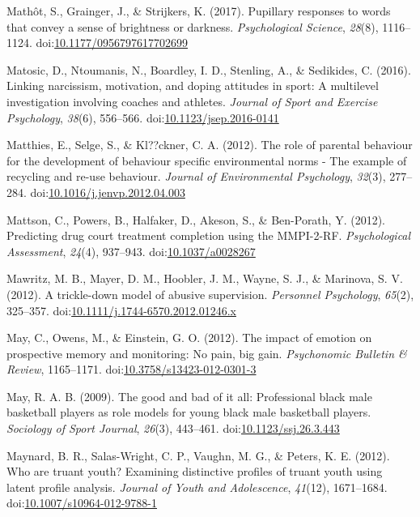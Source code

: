 \documentclass[english,man]{apa6}
\begin{document}
\hypertarget{ref-Mathot2017}{}
Mathôt, S., Grainger, J., \& Strijkers, K. (2017). Pupillary responses
to words that convey a sense of brightness or darkness.
\emph{Psychological Science}, \emph{28}(8), 1116--1124.
doi:\href{https://doi.org/10.1177/0956797617702699}{10.1177/0956797617702699}

\hypertarget{ref-Matosic2016}{}
Matosic, D., Ntoumanis, N., Boardley, I. D., Stenling, A., \& Sedikides,
C. (2016). Linking narcissism, motivation, and doping attitudes in
sport: A multilevel investigation involving coaches and athletes.
\emph{Journal of Sport and Exercise Psychology}, \emph{38}(6), 556--566.
doi:\href{https://doi.org/10.1123/jsep.2016-0141}{10.1123/jsep.2016-0141}

\hypertarget{ref-Matthies2012}{}
Matthies, E., Selge, S., \& Kl??ckner, C. A. (2012). The role of
parental behaviour for the development of behaviour specific
environmental norms - The example of recycling and re-use behaviour.
\emph{Journal of Environmental Psychology}, \emph{32}(3), 277--284.
doi:\href{https://doi.org/10.1016/j.jenvp.2012.04.003}{10.1016/j.jenvp.2012.04.003}

\hypertarget{ref-Mattson2012}{}
Mattson, C., Powers, B., Halfaker, D., Akeson, S., \& Ben-Porath, Y.
(2012). Predicting drug court treatment completion using the MMPI-2-RF.
\emph{Psychological Assessment}, \emph{24}(4), 937--943.
doi:\href{https://doi.org/10.1037/a0028267}{10.1037/a0028267}

\hypertarget{ref-Mawritz2012}{}
Mawritz, M. B., Mayer, D. M., Hoobler, J. M., Wayne, S. J., \& Marinova,
S. V. (2012). A trickle-down model of abusive supervision.
\emph{Personnel Psychology}, \emph{65}(2), 325--357.
doi:\href{https://doi.org/10.1111/j.1744-6570.2012.01246.x}{10.1111/j.1744-6570.2012.01246.x}

\hypertarget{ref-May2012}{}
May, C., Owens, M., \& Einstein, G. O. (2012). The impact of emotion on
prospective memory and monitoring: No pain, big gain. \emph{Psychonomic
Bulletin \& Review}, 1165--1171.
doi:\href{https://doi.org/10.3758/s13423-012-0301-3}{10.3758/s13423-012-0301-3}

\hypertarget{ref-May2009}{}
May, R. A. B. (2009). The good and bad of it all: Professional black
male basketball players as role models for young black male basketball
players. \emph{Sociology of Sport Journal}, \emph{26}(3), 443--461.
doi:\href{https://doi.org/10.1123/ssj.26.3.443}{10.1123/ssj.26.3.443}

\hypertarget{ref-Maynard2012}{}
Maynard, B. R., Salas-Wright, C. P., Vaughn, M. G., \& Peters, K. E.
(2012). Who are truant youth? Examining distinctive profiles of truant
youth using latent profile analysis. \emph{Journal of Youth and
Adolescence}, \emph{41}(12), 1671--1684.
doi:\href{https://doi.org/10.1007/s10964-012-9788-1}{10.1007/s10964-012-9788-1}
\end{document}
